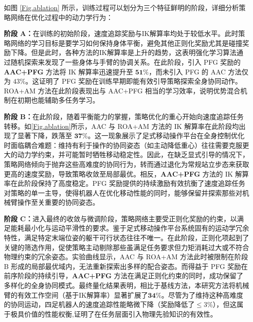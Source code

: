 如图 \ref{Fig.ablation} 所示，训练过程可以划分为三个特征鲜明的阶段，详细分析策略网络在优化过程中的动力学行为：

\textbf{阶段 A：}在训练的初始阶段，速度追踪奖励与IK解算率均处于较低水平。此时策略网络的学习目标是要学习如何保持身体平衡，避免其他正则化奖励尤其是碰撞奖励下降。但是此时，各种方法的IK解算率是上升的趋势，这表明强化学习算法通过随机探索来发现了一些身体与手臂的协调关系。在此阶段，引入 PFG 奖励的 \textbf{AAC+PFG} 方法将 IK 解算率迅速提升至 $\mathbf{51\%}$，而未引入 PFG 的 AAC 方法仅为 $43\%$。这证明了 PFG 奖励在训练早期即能有效引导策略探索全身协同动作。ROA+AM 方法在此阶段表现出与 AAC+PFG 相当的学习效率，说明优势混合机制在初期也能辅助多任务学习。

\textbf{阶段 B：}在此阶段，随着平衡能力的掌握，策略优化的重心开始向速度追踪任务转移。如\autoref{Fig.ablation}所示，AAC 与 ROA+AM 方法的 IK 解算率在此阶段均出现了显著下降，跌落至 $\mathbf{37\%}$。这一现象展示了足式移动操作平台在全身控制优化时面临耦合难题：维持有利于操作的协同姿态（如主动降低重心）往往需要克服更大的动力学约束，并可能暂时牺牲移动稳定性。因此，在缺乏显式引导的情况下，策略网络倾向于抛弃这些高难度的协同行为，转而通过退化为常规站立步态来获取更高的速度奖励，导致策略收敛至局部最优。相反，\textbf{AAC+PFG} 方法的 IK 解算率在此阶段保持了高度稳定。PFG 奖励提供的持续激励有效抗衡了速度追踪任务对策略的单一主导，使得机器人在优化移动性能的同时，能够保留并探索那些对机械臂操作至关重要的协同姿态。

\textbf{阶段 C：}进入最终的收敛与微调阶段，策略网络主要受正则化奖励的约束，以满足能耗最小化与运动平滑性的要求。鉴于足式移动操作平台系统固有的运动学冗余特性，满足特定末端位姿的躯干可行状态往往不唯一。在此阶段，正则化项起到了关键的筛选作用，促使策略主动剔除那些虽满足任务要求但力矩消耗过大或不符合物理约束的冗余姿态。实验曲线显示，AAC 与 ROA+AM 方法此时被限制在阶段 B 形成的局部最优域内，无法重新探索出多样的配合姿态。而得益于 PFG 奖励在前序阶段的持续引导，\textbf{AAC+PFG} 方法在满足正则化约束的同时，成功保留了多样化的全身协同模式。最终量化结果表明，相比于基线方法，本研究方法将机械臂的有效工作空间（基于IK解算率）显著扩展了$\mathbf{34\%}$。尽管为了维持这种高难度的协同运动，四足机器人的速度追踪性能略微下降（奖励降低了$\le 3\%$），但这属于极具价值的性能权衡,证明了在任务层面引入物理先验知识的有效性。

